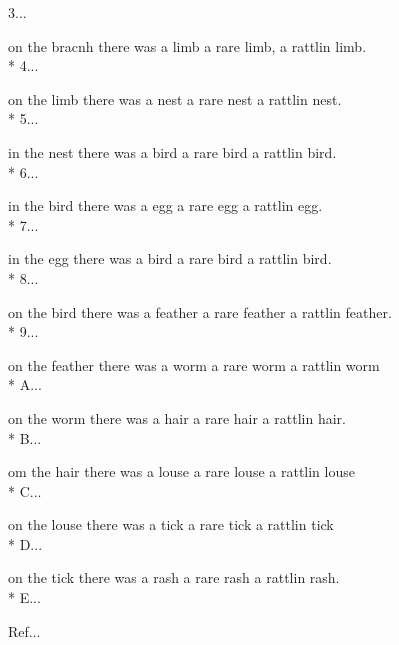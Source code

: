 \begin{SongText}
\begin{SongVerse}
3...
\end{SongVerse}
\begin{SongVerse}
on the bracnh there was a limb a rare limb, a rattlin limb.\\*%
4...
\end{SongVerse}
\begin{SongVerse}
on the limb there was a nest a rare nest a rattlin nest.\\*%
5...
\end{SongVerse}
\begin{SongVerse}
in the nest there was a bird a rare bird a rattlin bird.\\*%
6...
\end{SongVerse}
\begin{SongVerse}
in the bird there was a egg a rare egg a rattlin egg.\\*%
7...
\end{SongVerse}
\begin{SongVerse}
in the egg there was a bird a rare bird a rattlin bird.\\*%
8...
\end{SongVerse}
\begin{SongVerse}
on the bird there was a feather a rare feather a rattlin feather.\\*%
9...
\end{SongVerse}
\begin{SongVerse}
on the feather there was a worm a rare worm a rattlin worm\\*%
A...
\end{SongVerse}
\begin{SongVerse}
on the worm there was a hair a rare hair a rattlin hair. \\*%
B...
\end{SongVerse}
\begin{SongVerse}
om the hair there was a louse a rare louse a rattlin louse\\*%
C...
\end{SongVerse}
\begin{SongVerse}
on the louse there was a tick a rare tick a rattlin tick\\*%
D...
\end{SongVerse}
\begin{SongVerse}
on the tick there was a rash a rare rash a rattlin rash.\\*%
E...
\end{SongVerse}
\begin{SongVerse}
Ref...
\end{SongVerse}
\end{SongText}
